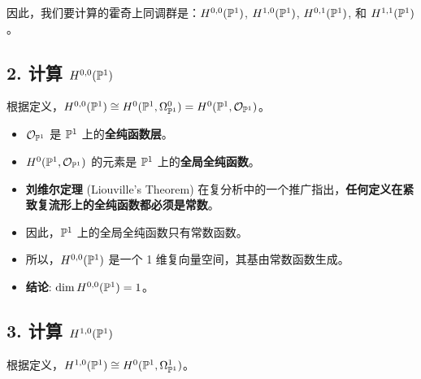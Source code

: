 \documentclass{amsart}
\let\originalmathbb\mathbb
\renewcommand{\mathbb}[1]{%
    \ifstrequal{#1}{1}{\mathbbm{#1}}{\originalmathbb{#1}}%
}
\theoremstyle{plain}
\theoremstyle{definition}
\theoremstyle{remark}
\begin{document}
因此，我们要计算的霍奇上同调群是：$H^{0,0}(\mathbb{P}^1)$, $H^{1,0}(\mathbb{P}^1)$, $H^{0,1}(\mathbb{P}^1)$, 和 $H^{1,1}(\mathbb{P}^1)$。

\subsection{2. 计算 \texorpdfstring{$H^{0,0}(\mathbb{P}^1)$}{H^0,0(P^1)}}

根据定义，$H^{0,0}(\mathbb{P}^1) \cong H^0(\mathbb{P}^1, \Omega^0_{\mathbb{P}^1}) = H^0(\mathbb{P}^1, \mathcal{O}_{\mathbb{P}^1})$。

\begin{itemize}
	\item $\mathcal{O}_{\mathbb{P}^1}$ 是 $\mathbb{P}^1$ 上的\textbf{全纯函数层}。
	\item $H^0(\mathbb{P}^1, \mathcal{O}_{\mathbb{P}^1})$ 的元素是 $\mathbb{P}^1$ 上的\textbf{全局全纯函数}。
	\item \textbf{刘维尔定理} (Liouville's Theorem) 在复分析中的一个推广指出，\textbf{任何定义在紧致复流形上的全纯函数都必须是常数}。
	\item 因此，$\mathbb{P}^1$ 上的全局全纯函数只有常数函数。
	\item 所以，$H^{0,0}(\mathbb{P}^1)$ 是一个 1 维复向量空间，其基由常数函数生成。
	\item \textbf{结论}: $\dim H^{0,0}(\mathbb{P}^1) = 1$。
\end{itemize}

\subsection{3. 计算 \texorpdfstring{$H^{1,0}(\mathbb{P}^1)$}{H^1,0(P^1)}}

根据定义，$H^{1,0}(\mathbb{P}^1) \cong H^0(\mathbb{P}^1, \Omega^1_{\mathbb{P}^1})$。
\end{document}
